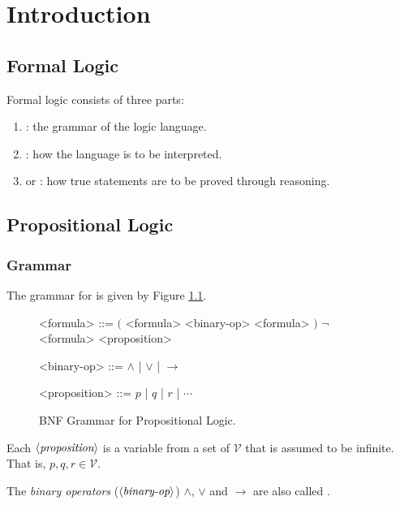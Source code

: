 \chapter{Introduction}

\section{Formal Logic}

Formal logic consists of three parts:

\begin{enumerate}
    \item {}: the grammar of the logic language.
    \item {}: how the language is to be interpreted.
    \item {} or : how true statements are
        to be proved through reasoning.
\end{enumerate}

\section{Propositional Logic}

\subsection{Grammar}

The grammar for  is given by Figure 
\ref{fig:propositional_logic_bnf}.

\begin{figure}[H]
    \centering
    \begin{grammar}
    <formula> ::= $($ <formula> <binary-op> <formula> $)$
        \alt $\neg$ <formula>
        \alt <proposition>
    
    <binary-op> ::= $\land$ | $\lor$ | $\to$
    
    <proposition> ::= $p$ | $q$ | $r$ | $\cdots$
    \end{grammar}
    \caption{BNF Grammar for Propositional Logic.}
    \label{fig:propositional_logic_bnf}
\end{figure}

Each $\langle {\textit{proposition}} \rangle$ is a variable from a set of
 $\mathcal{V}$ that is assumed to be infinite. That is, 
$p, q, r \in \mathcal{V}$.

The \textit{binary operators} ($\langle {\textit{binary-op}} \rangle$) $\land$, $\lor$ 
and $\to$ are also called .

